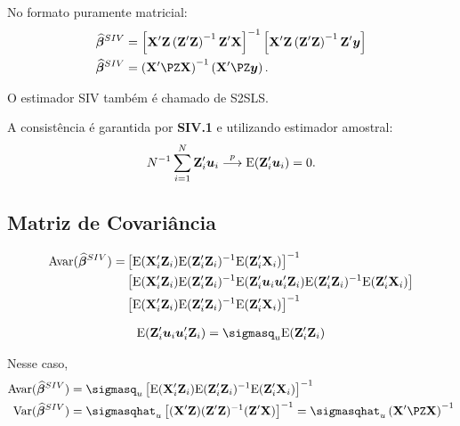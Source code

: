 \documentclass[11pt, oneside, a4paper, article]{article}
\numberwithin{equation}{section}
\begin{document}
\begin{description}
\noindent
No formato puramente matricial:
\begin{align*}
\betavechat^{SIV} &=
\left[ \Xmat' \Zmat \left( \Zmat' \Zmat \right)^{-1} \Zmat' \Xmat \right]^{-1}
\left[ \Xmat' \Zmat \left( \Zmat' \Zmat \right)^{-1} \Zmat' \yvec \right]
\\
\betavechat^{SIV} &= 
\left( \Xmat' \PZ \Xmat  \right)^{-1} \left( \Xmat' \PZ \yvec \right).
\end{align*}

\noindent
O estimador SIV também é chamado de S2SLS.

\noindent
A consistência é garantida por \textbf{SIV.1} e utilizando estimador amostral:
\begin{align*}
	N^{-1} \sum_{i=1}^{N} \mathbf{Z}_{i}' \boldsymbol{u}_{i}  \overset{p}{\longrightarrow}  \text{E}(\mathbf{Z}_{i}' \boldsymbol{u}_{i} ) = 0.
\end{align*}


\subsection{Matriz de Covariância}

\vspace{-2 em}
\begin{align*}
\text{Avar}(\widehat{\boldsymbol{\beta}}^{SIV}) = &
\left[ \text{E}( \mathbf{X}_{i}' \mathbf{Z}_{i} ) \text{E}( \mathbf{Z}_{i}' \mathbf{Z}_{i} )^{-1} \text{E}( \mathbf{Z}_{i}' \mathbf{X}_{i} ) \right]^{-1}
\\ &
\left[
\text{E}( \mathbf{X}_{i}' \mathbf{Z}_{i} ) \text{E}( \mathbf{Z}_{i}' \mathbf{Z}_{i} )^{-1}
\text{E}( \mathbf{Z}_{i}' \boldsymbol{u}_{i} \boldsymbol{u}_{i}' \mathbf{Z}_{i} ) 
\text{E}( \mathbf{Z}_{i}' \mathbf{Z}_{i} )^{-1} \text{E}( \mathbf{Z}_{i}' \mathbf{X}_{i} ) 
\right]
\\ &
\left[ \text{E}( \mathbf{X}_{i}' \mathbf{Z}_{i} ) \text{E}( \mathbf{Z}_{i}' \mathbf{Z}_{i} )^{-1} \text{E}( \mathbf{Z}_{i}' \mathbf{X}_{i} ) \right]^{-1}
\end{align*}

\begin{hypo}
\begin{align*}
	\E( \Zmat_{i}' \uvec_{i} \uvec_{i}' \Zmat_{i} )  = \sigmasq_{u} \E(\Zmat_{i}' \Zmat_{i})
\end{align*}
\end{hypo}

Nesse caso,
\begin{align*}
\Avar(\betavechat^{SIV}) &=
\sigmasq_{u}
\left[ \E( \Xmat_{i}' \Zmat_{i} ) \E( \Zmat_{i}' \Zmat_{i} )^{-1} \E( \Zmat_{i}' \Xmat_{i} ) \right]^{-1}
\\
\Var(\betavechat^{SIV}) &= 
\sigmasqhat_{u} \left[ (\Xmat' \Zmat) (\Zmat' \Zmat)^{-1} (\Zmat' \Xmat) \right]^{-1}
= \sigmasqhat_{u} \left( \Xmat' \PZ \Xmat \right)^{-1}
\end{align*}


\end{description}
\end{document}
